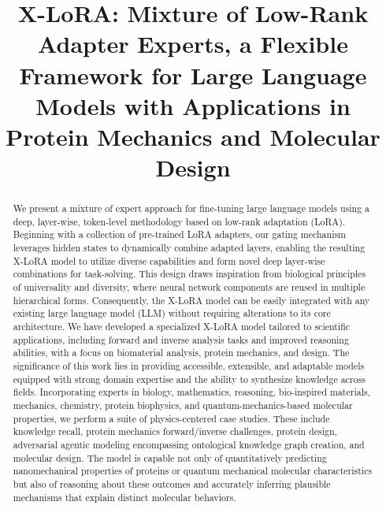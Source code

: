 \title{X-LoRA: Mixture of Low-Rank Adapter Experts, a Flexible Framework for Large Language Models with Applications in Protein Mechanics and Molecular Design}

\begin{abstract}
We present a mixture of expert approach for fine-tuning large language models using a deep, layer-wise, token-level methodology based on low-rank adaptation (LoRA). Beginning with a collection of pre-trained LoRA adapters, our gating mechanism leverages hidden states to dynamically combine adapted layers, enabling the resulting X-LoRA model to utilize diverse capabilities and form novel deep layer-wise combinations for task-solving. This design draws inspiration from biological principles of universality and diversity, where neural network components are reused in multiple hierarchical forms. Consequently, the X-LoRA model can be easily integrated with any existing large language model (LLM) without requiring alterations to its core architecture. We have developed a specialized X-LoRA model tailored to scientific applications, including forward and inverse analysis tasks and improved reasoning abilities, with a focus on biomaterial analysis, protein mechanics, and design. The significance of this work lies in providing accessible, extensible, and adaptable models equipped with strong domain expertise and the ability to synthesize knowledge across fields. Incorporating experts in biology, mathematics, reasoning, bio-inspired materials, mechanics, chemistry, protein biophysics, and quantum-mechanics-based molecular properties, we perform a suite of physics-centered case studies. These include knowledge recall, protein mechanics forward/inverse challenges, protein design, adversarial agentic modeling encompassing ontological knowledge graph creation, and molecular design. The model is capable not only of quantitatively predicting nanomechanical properties of proteins or quantum mechanical molecular characteristics but also of reasoning about these outcomes and accurately inferring plausible mechanisms that explain distinct molecular behaviors.
\end{abstract}

